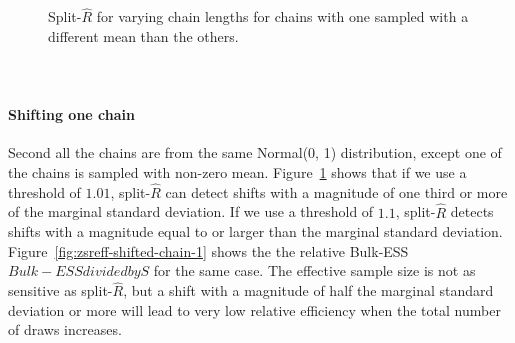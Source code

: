 \documentclass[american,]{article}
\let\oldparagraph\paragraph
\renewcommand{\paragraph}[1]{\oldparagraph{#1}\mbox{}}
\begin{document}
\begin{figure}[tp]
\begin{minipage}{0.48\textwidth}
  \caption{Split-\(\widehat{R}\) for varying chain lengths
    for chains with one sampled with a different mean than the others.\\~\\~}
  \label{fig:zsrhat-shifted-chain-1}
\end{minipage}
\end{figure}

\hypertarget{shifting-one-chain}{%
\paragraph{Shifting one chain}\label{shifting-one-chain}}

Second all the chains are from the same Normal(0, 1) distribution,
except one of the chains is sampled with non-zero
mean. Figure~\ref{fig:zsrhat-shifted-chain-1} shows that if we use a
threshold of \(1.01\), split-\(\widehat{R}\) can detect shifts with a
magnitude of one third or more of the marginal standard deviation. If
we use a threshold of \(1.1\), split-\(\widehat{R}\) detects shifts
with a magnitude equal to or larger than the marginal standard
deviation.
Figure~\ref{fig:zsreff-shifted-chain-1} shows the the relative
Bulk-ESS \(Bulk-ESS divided by S\) for the same case. The effective
sample size is not as sensitive as split-\(\widehat{R}\), but a shift
with a magnitude of half the marginal standard deviation or more will
lead to very low relative efficiency when the total number of draws
increases.
\end{document}
